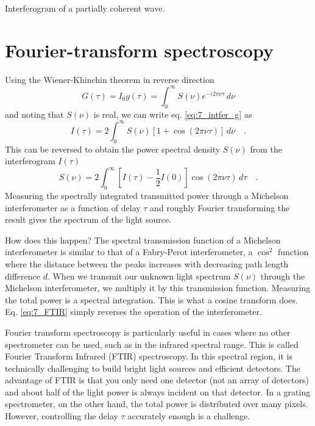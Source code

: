 \begin{marginfigure}
    \caption{Interferogram of a partially coherent wave.}
\end{marginfigure}

\section{Fourier-transform spectroscopy}

Using the Wiener-Khinchin theorem in reverse direction
\begin{equation}
    G(\tau) = I_0 g(\tau) = \int_0^\infty S(\nu) e^{-i 2 \pi \nu \tau} \, d\nu
\end{equation}
and noting that $S(\nu)$ is real, we can write eq.  \ref{eq:7_intfer_g} as
\begin{equation}
    I(\tau) = 2 \int_0^\infty S(\nu) \left[1 + \cos( 2 \pi \nu \tau ) \right] \, d\nu \quad .
\end{equation}
This can be reversed to obtain the power spectral density $S(\nu) $ from the interferogram $I(\tau)$
\begin{equation}
    S(\nu) = 2 \int_0^\infty \left[ I(\tau) - \frac{1}{2} I(0) \right] \cos( 2 \pi \nu \tau ) \, d\tau \quad .
    \label{eq:7_FTIR}
\end{equation}
Measuring the spectrally integrated transmitted power through a Michelson interferometer as a function of delay $\tau$ and roughly Fourier transforming the result gives the spectrum of the light source.

How does this happen? The spectral transmission function of a Michelson interferometer is similar to that of a Fabry-Perot interferometer, a $\cos^2$ function where the distance between the peaks increases with decreasing path length difference $d$. When we transmit our unknown light spectrum $S(\nu)$ through the Michelson interferometer, we multiply it by this transmission function. Measuring the total power is a spectral integration. This is what a cosine transform does. Eq.  \ref{eq:7_FTIR} simply reverses the operation of the interferometer.

Fourier transform spectroscopy is particularly useful in cases where no other spectrometer can be used, such as in the infrared spectral range. This is called Fourier Transform Infrared (FTIR) spectroscopy. In this spectral region, it is technically challenging to build bright light sources and efficient detectors. The advantage of FTIR is that you only need one detector (not an array of detectors) and about half of the light power is always incident on that detector. In a grating spectrometer, on the other hand, the total power is distributed over many pixels. However, controlling the delay $\tau$ accurately enough is a challenge.



